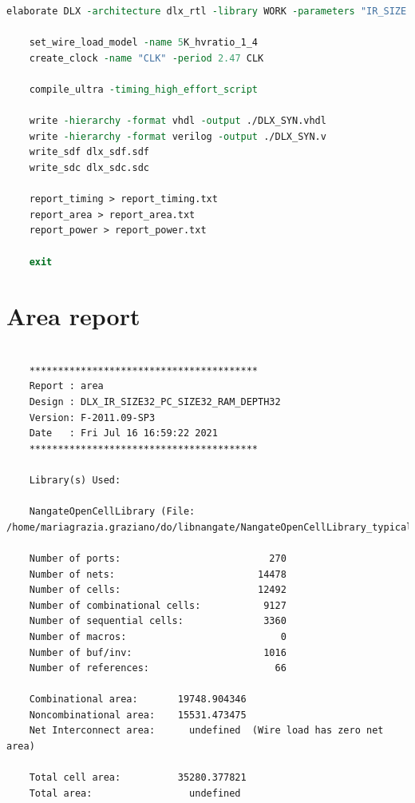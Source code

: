 \begin{lstlisting}[language=tcl,caption={TCL script for the DLX synthesis},label=tcl_syn]
	elaborate DLX -architecture dlx_rtl -library WORK -parameters "IR_SIZE = 32, PC_SIZE = 32, RAM_DEPTH = 32"
	
	set_wire_load_model -name 5K_hvratio_1_4
	create_clock -name "CLK" -period 2.47 CLK
	
	compile_ultra -timing_high_effort_script
	
	write -hierarchy -format vhdl -output ./DLX_SYN.vhdl
	write -hierarchy -format verilog -output ./DLX_SYN.v
	write_sdf dlx_sdf.sdf
	write_sdc dlx_sdc.sdc
	
	report_timing > report_timing.txt
	report_area > report_area.txt
	report_power > report_power.txt
	
	exit
\end{lstlisting}


\newappendix\label{ap3}
\section{Area report}
\begin{lstlisting}
	 
	****************************************
	Report : area
	Design : DLX_IR_SIZE32_PC_SIZE32_RAM_DEPTH32
	Version: F-2011.09-SP3
	Date   : Fri Jul 16 16:59:22 2021
	****************************************
	
	Library(s) Used:
	
	NangateOpenCellLibrary (File: /home/mariagrazia.graziano/do/libnangate/NangateOpenCellLibrary_typical_ecsm.db)
	
	Number of ports:                          270
	Number of nets:                         14478
	Number of cells:                        12492
	Number of combinational cells:           9127
	Number of sequential cells:              3360
	Number of macros:                           0
	Number of buf/inv:                       1016
	Number of references:                      66
	
	Combinational area:       19748.904346
	Noncombinational area:    15531.473475
	Net Interconnect area:      undefined  (Wire load has zero net area)
	
	Total cell area:          35280.377821
	Total area:                 undefined
\end{lstlisting}


